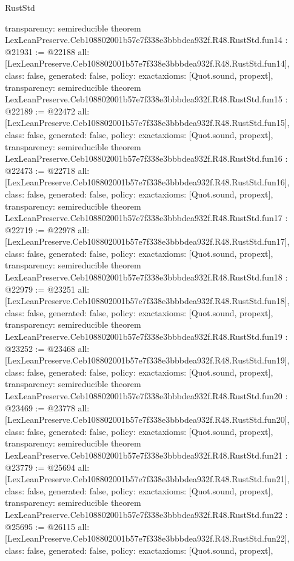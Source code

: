 \begin{lexlean}{RustStd}
\begin{coremodule}
{  transparency: semireducible
}
theorem LexLeanPreserve.Ceb108802001b57e7f338e3bbbdea932f.R48.RustStd.fun14 : @21931 := @22188 {
  all: [LexLeanPreserve.Ceb108802001b57e7f338e3bbbdea932f.R48.RustStd.fun14],
  class: false,
  generated: false,
  policy: exact{axioms: [Quot.sound, propext]},
  transparency: semireducible
}
theorem LexLeanPreserve.Ceb108802001b57e7f338e3bbbdea932f.R48.RustStd.fun15 : @22189 := @22472 {
  all: [LexLeanPreserve.Ceb108802001b57e7f338e3bbbdea932f.R48.RustStd.fun15],
  class: false,
  generated: false,
  policy: exact{axioms: [Quot.sound, propext]},
  transparency: semireducible
}
theorem LexLeanPreserve.Ceb108802001b57e7f338e3bbbdea932f.R48.RustStd.fun16 : @22473 := @22718 {
  all: [LexLeanPreserve.Ceb108802001b57e7f338e3bbbdea932f.R48.RustStd.fun16],
  class: false,
  generated: false,
  policy: exact{axioms: [Quot.sound, propext]},
  transparency: semireducible
}
theorem LexLeanPreserve.Ceb108802001b57e7f338e3bbbdea932f.R48.RustStd.fun17 : @22719 := @22978 {
  all: [LexLeanPreserve.Ceb108802001b57e7f338e3bbbdea932f.R48.RustStd.fun17],
  class: false,
  generated: false,
  policy: exact{axioms: [Quot.sound, propext]},
  transparency: semireducible
}
theorem LexLeanPreserve.Ceb108802001b57e7f338e3bbbdea932f.R48.RustStd.fun18 : @22979 := @23251 {
  all: [LexLeanPreserve.Ceb108802001b57e7f338e3bbbdea932f.R48.RustStd.fun18],
  class: false,
  generated: false,
  policy: exact{axioms: [Quot.sound, propext]},
  transparency: semireducible
}
theorem LexLeanPreserve.Ceb108802001b57e7f338e3bbbdea932f.R48.RustStd.fun19 : @23252 := @23468 {
  all: [LexLeanPreserve.Ceb108802001b57e7f338e3bbbdea932f.R48.RustStd.fun19],
  class: false,
  generated: false,
  policy: exact{axioms: [Quot.sound, propext]},
  transparency: semireducible
}
theorem LexLeanPreserve.Ceb108802001b57e7f338e3bbbdea932f.R48.RustStd.fun20 : @23469 := @23778 {
  all: [LexLeanPreserve.Ceb108802001b57e7f338e3bbbdea932f.R48.RustStd.fun20],
  class: false,
  generated: false,
  policy: exact{axioms: [Quot.sound, propext]},
  transparency: semireducible
}
theorem LexLeanPreserve.Ceb108802001b57e7f338e3bbbdea932f.R48.RustStd.fun21 : @23779 := @25694 {
  all: [LexLeanPreserve.Ceb108802001b57e7f338e3bbbdea932f.R48.RustStd.fun21],
  class: false,
  generated: false,
  policy: exact{axioms: [Quot.sound, propext]},
  transparency: semireducible
}
theorem LexLeanPreserve.Ceb108802001b57e7f338e3bbbdea932f.R48.RustStd.fun22 : @25695 := @26115 {
  all: [LexLeanPreserve.Ceb108802001b57e7f338e3bbbdea932f.R48.RustStd.fun22],
  class: false,
  generated: false,
  policy: exact{axioms: [Quot.sound, propext]},
}
\end{coremodule}
\end{lexlean}
